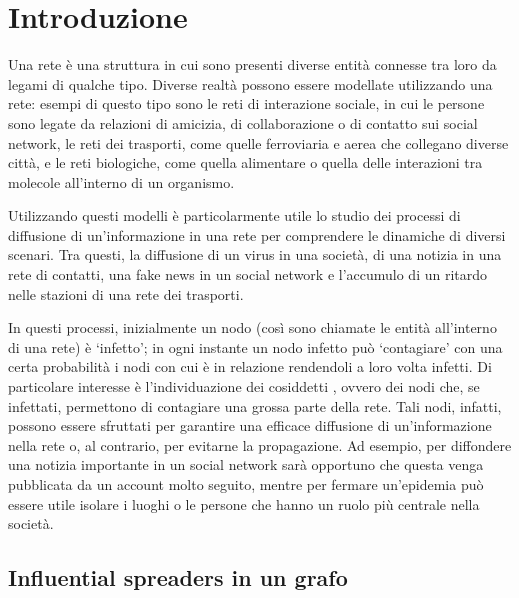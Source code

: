 \chapter{Introduzione}

Una rete è una struttura in cui sono presenti diverse entità connesse tra loro da legami 
di qualche tipo. Diverse realtà possono essere modellate utilizzando una rete:
esempi di questo tipo sono le reti di interazione sociale, in cui le persone sono legate 
da relazioni di amicizia, di collaborazione o di contatto sui social network, 
le reti dei trasporti, come quelle ferroviaria e aerea
che collegano diverse città, e le reti biologiche, come quella alimentare o
quella delle interazioni tra molecole all'interno di un organismo.

Utilizzando questi modelli è particolarmente utile lo studio dei processi di diffusione
di un'informazione in una rete per comprendere le dinamiche di diversi scenari.
Tra questi, la diffusione di un virus in una società, di una notizia in una rete di contatti, 
una fake news in un social network e l'accumulo di un ritardo nelle stazioni di una rete 
dei trasporti.

In questi processi, inizialmente un nodo (così sono chiamate le entità all'interno di una rete) 
è `infetto'; in ogni instante un nodo infetto può `contagiare' con una certa probabilità i 
nodi con cui è in relazione rendendoli a loro volta infetti.
Di particolare interesse è l'individuazione dei cosiddetti \infsp, ovvero dei nodi
che, se infettati, permettono di contagiare una grossa parte della rete.
Tali nodi, infatti, possono essere sfruttati per garantire una efficace diffusione 
di un'informazione nella rete o, al contrario, per evitarne la propagazione.
Ad esempio, per diffondere una notizia importante in un social network sarà opportuno che 
questa venga pubblicata da un account molto seguito, mentre per fermare un'epidemia 
può essere utile isolare i luoghi o le persone che hanno un ruolo più centrale
nella società.


\section{Influential spreaders in un grafo}

